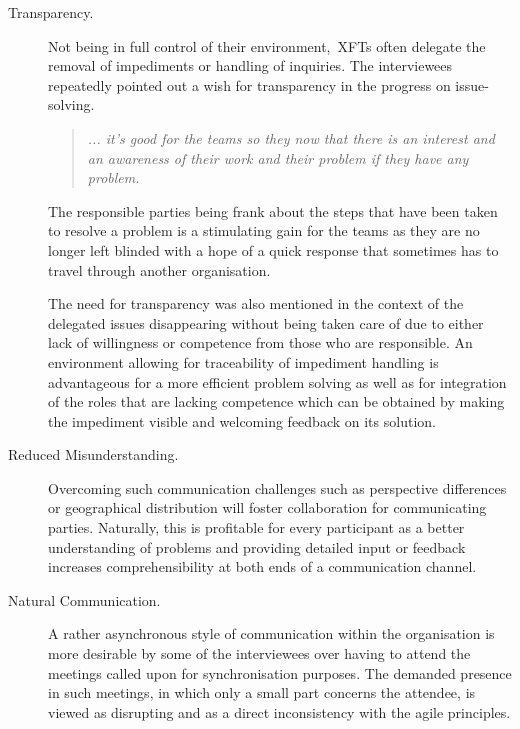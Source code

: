 \begin{description}

   \item[Transparency.] Not being in full control of their environment,~\acp{XFT} often delegate the removal of impediments or handling of inquiries. The interviewees repeatedly pointed out a wish for transparency in the progress on issue-solving.
   
   \begin{quote} \itshape... it's good for the teams so they now that there is an interest and an awareness of their work and their problem if they have any problem.
   \end{quote}
   
   The responsible parties being frank about the steps that have been taken to resolve a problem is a stimulating gain for the teams as they are no longer left blinded with a hope of a quick response that sometimes has to travel through another organisation.
   
The need for transparency was also mentioned in the context of the delegated issues disappearing without being taken care of due to either lack of willingness or competence from those who are responsible. An environment allowing for traceability of impediment handling is advantageous for a more efficient problem solving as well as for integration of the roles that are lacking competence which can be obtained by making the impediment visible and welcoming feedback on its solution.

   \item[Reduced Misunderstanding.] Overcoming such communication challenges such as perspective differences or geographical distribution will foster collaboration for communicating parties. Naturally, this is profitable for every participant as a better understanding of problems and providing detailed input or feedback increases comprehensibility at both ends of a communication channel.

   \item[Natural Communication.] A rather asynchronous style of communication within the organisation is more desirable by some of the interviewees over having to attend the meetings called upon for synchronisation purposes. The demanded presence in such meetings, in which only a small part concerns the attendee, is viewed as disrupting and as a direct inconsistency with the agile principles. %
   

\end{description}
